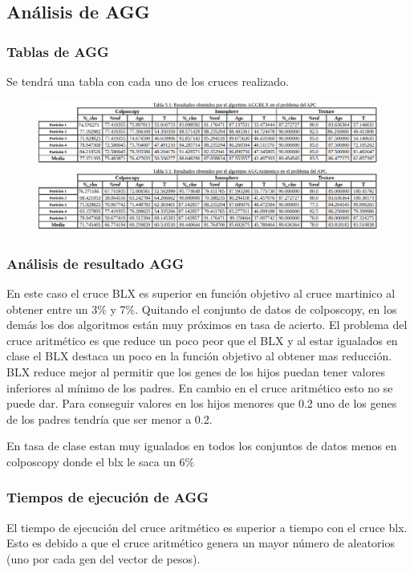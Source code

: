 \documentclass[titlepage]{article}
\begin{document}
	\subsection{Análisis de AGG}
	\subsubsection{Tablas de AGG}
	Se tendrá una tabla con cada uno de los cruces realizado.
	\begin{figure}[H]
		\centering
		\includegraphics[width=1\linewidth]{screenshot005}
		\caption{}
		\label{fig:screenshot005}
	\end{figure}
	
	\subsubsection{Análisis de resultado AGG}
	En este caso el cruce BLX  es superior en función objetivo al cruce martinico al obtener entre un 3\% y 7\%. Quitando el conjunto de datos de colposcopy, en los demás los dos algoritmos están muy próximos en tasa de acierto. El problema del cruce aritmético es que reduce un poco peor que el BLX y al estar igualados en clase el BLX destaca un poco en la función objetivo al obtener mas reducción. BLX reduce mejor al permitir que los genes de los hijos puedan tener valores inferiores al mínimo de los padres. En cambio en el cruce aritmético esto no se puede dar. Para conseguir valores en los hijos menores que 0.2 uno de los genes de los padres tendría que ser menor a 0.2.
	
	En tasa de clase estan muy igualados en todos los conjuntos de datos menos en colposcopy donde el blx le saca un 6\%
	\subsubsection{Tiempos de ejecución de AGG}
	El tiempo de ejecución del cruce aritmético es superior a tiempo con el cruce blx. Esto es debido a que el cruce aritmético genera un mayor número de aleatorios (uno por cada gen del vector de pesos).
\end{document}
